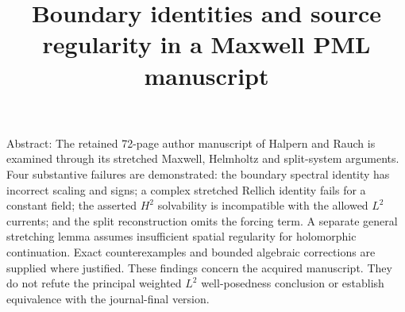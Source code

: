 \documentclass[10pt]{article}
\title{Boundary identities and source regularity in a Maxwell PML manuscript}
\author{}
\date{}
\begin{document}
\maketitle
Abstract: The retained 72-page author manuscript of Halpern and Rauch is examined through its stretched Maxwell, Helmholtz and split-system arguments. Four substantive failures are demonstrated: the boundary spectral identity has incorrect scaling and signs; a complex stretched Rellich identity fails for a constant field; the asserted \(H^2\) solvability is incompatible with the allowed \(L^2\) currents; and the split reconstruction omits the forcing term. A separate general stretching lemma assumes insufficient spatial regularity for holomorphic continuation. Exact counterexamples and bounded algebraic corrections are supplied where justified. These findings concern the acquired manuscript. They do not refute the principal weighted \(L^2\) well-posedness conclusion or establish equivalence with the journal-final version.\par
\end{document}

